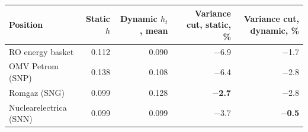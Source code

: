 \begin{tabular}{lrrrr}
\toprule
Position & Static $h$ & Dynamic $h_t$, mean & Variance cut, static, \% & Variance cut, dynamic, \% \\
\midrule
RO energy basket & 0.112 & 0.090 & $-$6.9 & $-$1.7 \\
OMV Petrom (SNP) & 0.138 & 0.108 & $-$6.4 & $-$2.8 \\
Romgaz (SNG) & 0.099 & 0.128 & \textbf{$-$2.7} & $-$2.8 \\
Nuclearelectrica (SNN) & 0.099 & 0.099 & $-$3.7 & \textbf{$-$0.5} \\
\bottomrule
\end{tabular}
